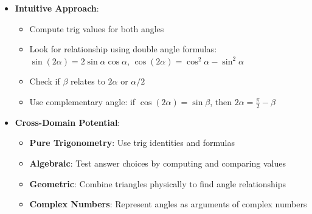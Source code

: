 \documentclass[11pt]{article}
\begin{document}
\begin{problemconfigbox}
\begin{itemize}[leftmargin=*]
    \item \textbf{Intuitive Approach}: 
    \begin{itemize}
        \item Compute trig values for both angles
        \item Look for relationship using double angle formulas: $\sin(2\alpha) = 2\sin\alpha\cos\alpha$, $\cos(2\alpha) = \cos^2\alpha - \sin^2\alpha$
        \item Check if $\beta$ relates to $2\alpha$ or $\alpha/2$
        \item Use complementary angle: if $\cos(2\alpha) = \sin\beta$, then $2\alpha = \frac{\pi}{2} - \beta$
    \end{itemize}
    
    \item \textbf{Cross-Domain Potential}: 
    \begin{itemize}
        \item \textbf{Pure Trigonometry}: Use trig identities and formulas
        \item \textbf{Algebraic}: Test answer choices by computing and comparing values
        \item \textbf{Geometric}: Combine triangles physically to find angle relationships
        \item \textbf{Complex Numbers}: Represent angles as arguments of complex numbers
    \end{itemize}
\end{itemize}
\end{problemconfigbox}
\end{document}
